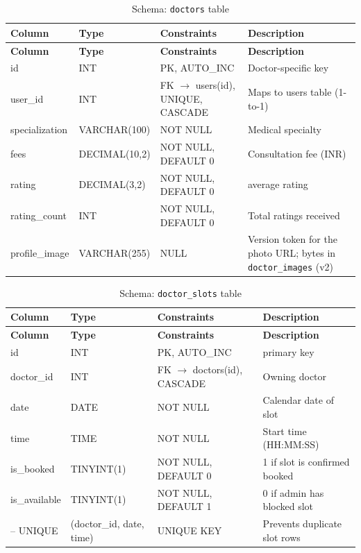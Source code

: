 \begin{longtable}{|L{2.8cm}|L{2.6cm}|L{2.2cm}|L{5.2cm}|}
\caption{Schema: \texttt{doctors} table} \label{tab:doctors} \\
\hline
\textbf{Column} & \textbf{Type} & \textbf{Constraints} & \textbf{Description} \\
\hline
\endfirsthead
\hline
\textbf{Column} & \textbf{Type} & \textbf{Constraints} & \textbf{Description} \\
\hline
\endhead
\hline
\endfoot
id             & INT              & PK, AUTO\_INC   & Doctor-specific key \\
\hline
user\_id       & INT              & FK $\rightarrow$ users(id), UNIQUE, CASCADE & Maps to users table (1-to-1) \\
\hline
specialization & VARCHAR(100)     & NOT NULL        & Medical specialty \\
\hline
fees           & DECIMAL(10,2)    & NOT NULL, DEFAULT 0 & Consultation fee (INR) \\
\hline
rating         & DECIMAL(3,2)     & NOT NULL, DEFAULT 0 & average rating \\
\hline
rating\_count  & INT              & NOT NULL, DEFAULT 0 & Total ratings received \\
\hline
profile\_image & VARCHAR(255)     & NULL            & Version token for the photo URL; bytes in \texttt{doctor\_images} (v2) \\
\hline
\end{longtable}

\begin{longtable}{|L{2.8cm}|L{2.6cm}|L{2.2cm}|L{5.2cm}|}
\caption{Schema: \texttt{doctor\_slots} table} \label{tab:slots} \\
\hline
\textbf{Column} & \textbf{Type} & \textbf{Constraints} & \textbf{Description} \\
\hline
\endfirsthead
\hline
\textbf{Column} & \textbf{Type} & \textbf{Constraints} & \textbf{Description} \\
\hline
\endhead
\hline
\endfoot
id          & INT           & PK, AUTO\_INC     &  primary key \\
\hline
doctor\_id  & INT           & FK $\rightarrow$ doctors(id), CASCADE & Owning doctor \\
\hline
date        & DATE          & NOT NULL          & Calendar date of slot \\
\hline
time        & TIME          & NOT NULL          & Start time (HH:MM:SS) \\
\hline
is\_booked  & TINYINT(1)    & NOT NULL, DEFAULT 0 & 1 if slot is confirmed booked \\
\hline
is\_available & TINYINT(1)  & NOT NULL, DEFAULT 1 & 0 if admin has blocked slot \\
\hline
-- UNIQUE   & (doctor\_id, date, time) & UNIQUE KEY & Prevents duplicate slot rows \\
\hline
\end{longtable}

